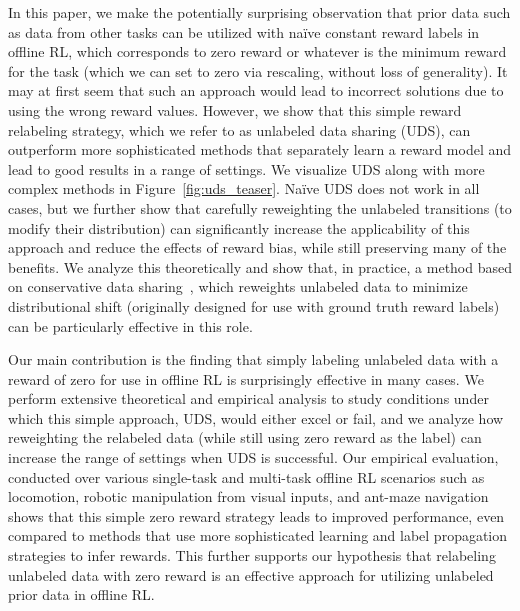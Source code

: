 \documentclass[../thesis.tex]{subfiles}
\begin{document}
In this paper, we make the potentially surprising observation that prior data such as data from other tasks can be utilized with na\"{i}ve constant reward labels in offline RL, which corresponds to zero reward or whatever is the minimum reward for the task (which we can set to zero via rescaling, without loss of generality). It may at first seem that such an approach would lead to incorrect solutions due to using the wrong reward values. However, we show that this simple reward relabeling strategy, which we refer to as unlabeled data sharing (UDS), can outperform more sophisticated methods that separately learn a reward model and lead to good results in a range of settings. We visualize UDS along with more complex methods in Figure~\ref{fig:uds_teaser}. Na\"{i}ve UDS does not work in all cases, but we further show that carefully reweighting the unlabeled transitions (to modify their distribution) can significantly increase the applicability of this approach and reduce the effects of reward bias, while still preserving many of the benefits. {We analyze this theoretically and show that, in practice, a method based on conservative data sharing~\citep{yu2021conservative}, which reweights unlabeled data to minimize distributional shift (originally designed for use with ground truth reward labels) can be particularly effective in this role.}

Our main contribution is the finding that simply labeling unlabeled data with a reward of zero for use in offline RL is surprisingly effective in many cases. We perform extensive theoretical and empirical analysis to study conditions under which this simple approach, UDS, would either excel or fail, and we analyze how reweighting the relabeled data (while still using zero reward as the label) can increase the range of settings when UDS is successful. Our empirical evaluation, conducted over various single-task and multi-task offline RL scenarios such as locomotion, robotic manipulation from visual inputs, and ant-maze navigation shows that this simple zero reward strategy leads to improved performance, even compared to methods that use more sophisticated learning and label propagation strategies to infer rewards. This further supports our hypothesis that relabeling unlabeled data with zero reward is an effective approach for utilizing unlabeled prior data in offline RL.
    
    





\end{document}
